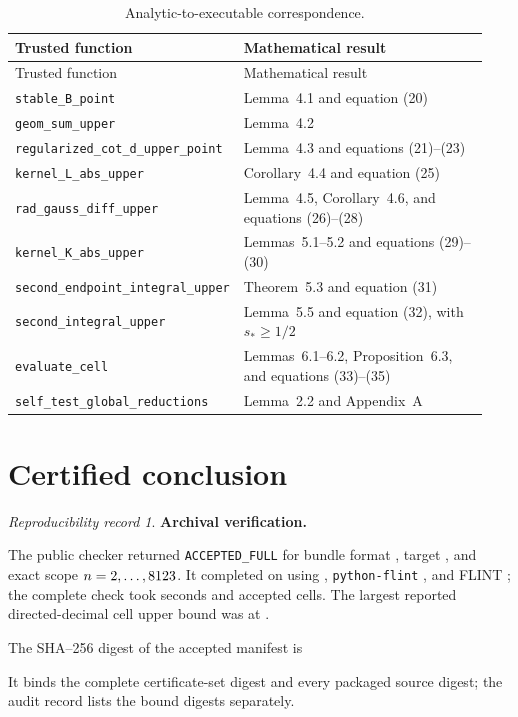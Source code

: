 \documentclass[11pt,a4paper,twoside]{article}
\theoremstyle{remark}
\newtheorem*{finalrecord}{Reproducibility record}
\newcommand{\code}[1]{\texttt{#1}}
\begin{document}
\begin{longtable}{@{}p{0.40\linewidth}p{0.54\linewidth}@{}}
\caption{Analytic-to-executable correspondence.}
\label{tab:correspondence}\\
\toprule
Trusted function & Mathematical result\\
\midrule
\endfirsthead
\toprule
Trusted function & Mathematical result\\
\midrule
\endhead
\code{stable\_B\_point}
  & Lemma~4.1 and equation (20)\\
\code{geom\_sum\_upper}
  & Lemma~4.2\\
\code{regularized\_cot\_d\_upper\_point}
  & Lemma~4.3 and equations (21)--(23)\\
\code{kernel\_L\_abs\_upper}
  & Corollary~4.4 and equation (25)\\
\code{rad\_gauss\_diff\_upper}
  & Lemma~4.5, Corollary~4.6, and equations (26)--(28)\\
\code{kernel\_K\_abs\_upper}
  & Lemmas~5.1--5.2 and equations (29)--(30)\\
\code{second\_endpoint\_integral\_upper}
  & Theorem~5.3 and equation (31)\\
\code{second\_integral\_upper}
  & Lemma~5.5 and equation (32), with \(s_\ast\ge1/2\)\\
\code{evaluate\_cell}
  & Lemmas~6.1--6.2, Proposition~6.3, and equations (33)--(35)\\
\code{self\_test\_global\_reductions}
  & Lemma~2.2 and Appendix~A\\
\bottomrule
\end{longtable}

\section*{Certified conclusion}
\label{sec:certified-conclusion}

\ifcertificateaccepted
\begin{finalrecord}
\small
\raggedright
\textbf{Archival verification.}\par\smallskip
The public checker returned \code{ACCEPTED\_FULL} for bundle format
\code{\CertificateBundleFormat}, target \CertificateTarget, and exact scope
\(n=2,\ldots,8123\).  It completed on
\CertificateDate{} using \CertificateRuntime{}, \code{python-flint}
\CertificatePythonFlint, and FLINT \CertificateFlint; the complete check took
\CertificateElapsedSeconds{} seconds and accepted \CertificateTotalCells{}
cells.  The largest reported directed-decimal cell upper bound was
\CertificateWorstUpper{} at \CertificateWorstLocation.

The SHA--256 digest of the accepted manifest is
\par\smallskip
\noindent{\ttfamily\small\CertificateManifestDigest}\par\smallskip
It binds the complete certificate-set digest and every packaged
source digest; the audit record lists the bound digests separately.
\end{finalrecord}
\end{document}
